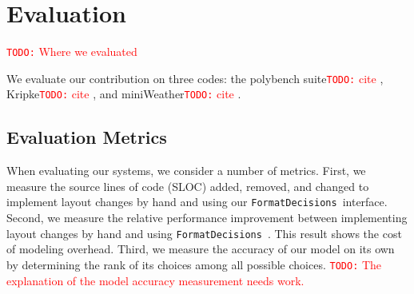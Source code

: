 \documentclass[sigconf, table]{acmart}
\newcommand{\todo}[1]{{\textcolor{red}{{\tt{TODO:}}\,\,#1 }}}
\newcommand{\nc}[0]{\todo{cite}}
\newcommand{\FormatDecisions}[0]{{\texttt{FormatDecisions}}~}
\begin{document}
\begin{comment}
\todo{Brandon, I am not seeing these figures right now.  Have they not been included into the repository yet?}
Figure~\ref{TraversalBenchmark2} shows the execution times for the different traversal orders for microbenchmark 2. 
While the traversal orders for this microbenchmark are all highly clustered, they are less differentiated from one another. 
For example, we see that the orders $(0,2)$ and $(1,2)$ have similar performance, as do $(2,0)$ and $(2,1)$. 
The similarity in performance is again attributable to the influence of the position of the innermost loop iterator. 



Figure~\ref{TraversalBenchmark3} shows the execution times for the different traversal orders for microbenchmark 3. 
A similar pattern as the previous microbenchmarks emerges here: grouping based on the position of the innermost iterator. 

The major benefit of using traversal order as a performance metric is its reusability. 
Because it condenses the policy, the layout, and the arguments used in the access into a single metric, the same benchmarking results can be used to estimate the cost of all three accesses within a matrix multiplication. 
Similarly, the benchmarking results for traversal orders gathered for one computation can be reused when modeling another computation.

\section{A Performance Model for Data Format}
\todo{Brandon, this is one of the key contributions of this paper and it is buried right now.}

\todo{explain how we use the traversal order information to build up a model and choose layouts and generate the computation}

\end{comment}
\section{Evaluation}

\todo{Where we evaluated}

We evaluate our contribution on three codes: the polybench suite\nc, Kripke\nc, and miniWeather\nc.


\subsection{Evaluation Metrics}
When evaluating our systems, we consider a number of metrics. 
First,  we measure the source lines of code (SLOC) added, removed, and changed to implement layout changes by hand and using our \FormatDecisions interface.
Second, we measure the relative performance improvement between implementing layout changes by hand and using \FormatDecisions. 
This result shows the cost of modeling overhead.
Third, we measure the accuracy of our model on its own by determining the rank of its choices among all possible choices.
\todo{The explanation of the model accuracy measurement needs work.} 
\end{document}
